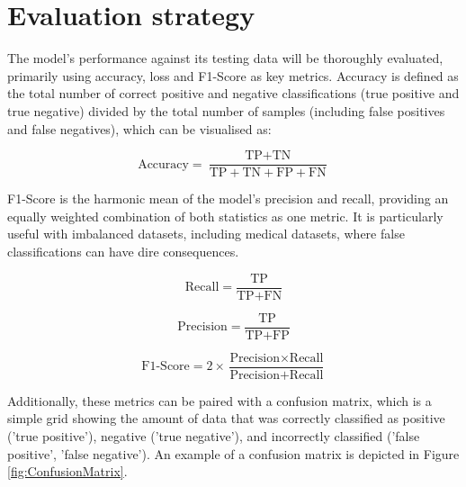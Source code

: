 \documentclass[12pt]{report}
\newcommand{\para}{\vspace{7pt}\noindent}
\begin{document}
\newpage

\section{Evaluation strategy}\label{sec:Eval}
The model's performance against its testing data will be thoroughly evaluated, primarily using accuracy, loss and F1-Score as key metrics.
Accuracy is defined as the total number of correct positive and negative classifications (true positive and true negative) 
divided by the total number of samples (including false positives and false negatives), which can be visualised as:

\begin{equation}\label{eq:Accuracy}
    \text{Accuracy} = \frac{\text{TP} + \text{TN}}{\text{TP} + \text{TN} + \text{FP} + \text{FN}}
\end{equation}

\para F1-Score is the harmonic mean of the model's precision and recall, providing an equally weighted combination of both statistics as one 
metric. It is particularly useful with imbalanced datasets, including medical datasets, where false classifications can have dire consequences.

\begin{equation}\label{eq:Recall}
    \text{Recall} = \frac{\text{TP}}{\text{TP} + \text{FN}}
\end{equation}

\begin{equation}\label{eq:Precision}
    \text{Precision} = \frac{\text{TP}}{\text{TP} + \text{FP}}
\end{equation}

\begin{equation}\label{eq:F1Score}
    \text{F1-Score} = 2 \times \frac{\text{Precision} \times \text{Recall}}{\text{Precision} + \text{Recall}}
\end{equation}

\para Additionally, these metrics can be paired with a confusion matrix, which is a simple grid 
showing the amount of data that was correctly classified as positive ('true positive'), negative ('true negative'), and incorrectly classified
('false positive', 'false negative'). An example of a confusion matrix is depicted in Figure \ref{fig:ConfusionMatrix}.
\end{document}
